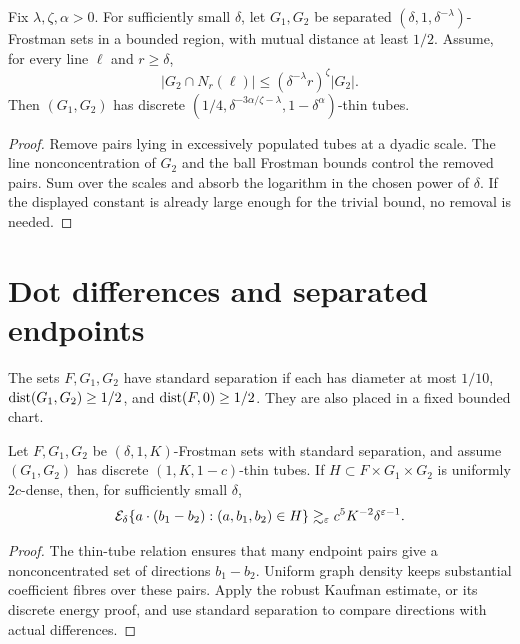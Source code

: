 \begin{lemma}
\label{lem:quarter-thin-tubes}
\leanok
{}
Fix $\lambda,\zeta,\alpha>0$. For sufficiently small $\delta$,
let $G_1,G_2$ be separated $(\delta,1,\delta^{-\lambda})$-Frostman
sets in a bounded region, with mutual distance at least $1/2$.
Assume, for every line $\ell$ and $r\geq\delta$,
\[
            |G_2\cap N_r(\ell)|
                       \leq(\delta^{-\lambda}r)^\zeta|G_2|.
\]
Then $(G_1,G_2)$ has discrete
$(1/4,\delta^{-3\alpha/\zeta-\lambda},1-\delta^\alpha)$-thin
tubes.
\end{lemma}
\begin{proof}
\leanok
Remove pairs lying in excessively populated tubes at a dyadic scale.
The line nonconcentration of $G_2$ and the ball Frostman bounds
control the removed pairs. Sum over the scales and absorb the
logarithm in the chosen power of $\delta$. If the displayed
constant is already large enough for the trivial bound, no removal
is needed.
\end{proof}

\section{Dot differences and separated endpoints}

\begin{definition}
\label{def:standard-separation}
\leanok
The sets $F,G_1,G_2$ have standard separation if each has diameter
at most $1/10$, $\operatorname{dist}(G_1,G_2)\geq1/2$, and
$\operatorname{dist}(F,0)\geq1/2$. They are also placed in a fixed bounded chart.
\end{definition}

\begin{lemma}
\label{lem:thin-tubes-dots}
\leanok
{}
Let $F,G_1,G_2$ be $(\delta,1,K)$-Frostman sets with standard
separation, and assume $(G_1,G_2)$ has discrete
$(1,K,1-c)$-thin tubes. If $H\subset F\times G_1\times G_2$
is uniformly $2c$-dense, then, for sufficiently small $\delta$,
\[
 \mathcal{E}_\delta\{a\cdot(b_1-b_2):(a,b_1,b_2)\in H\}
                       \gtrsim_\varepsilon c^5K^{-2}\delta^{\varepsilon-1}.
\]
\end{lemma}
\begin{proof}
\leanok
The thin-tube relation ensures that many endpoint pairs give a
nonconcentrated set of directions $b_1-b_2$. Uniform graph density
keeps substantial coefficient fibres over these pairs. Apply the
robust Kaufman estimate, or its discrete energy proof, and use
standard separation to compare directions with actual differences.
\end{proof}

